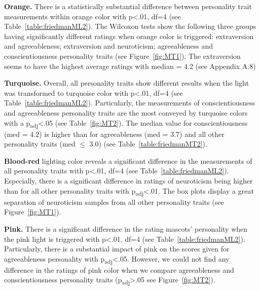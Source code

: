 \par\textbf{Orange.}
There is a statistically substantial difference between personality trait measurements within
orange color with p<.01, df=4 (see Table~\ref{table:friedmanML2}).
The Wilcoxon tests show the following three groups having significantly different ratings when orange
color is triggered: extraversion and agreeableness;
extraversion and neuroticism;
agreeableness and conscientiousness personality traits (see Figure~\ref{fig:MT1}).
The extraversion seems to have the highest average ratings with median = 4.2 (see Appendix A.8)

\par\textbf{Turquoise.}
Overall, all personality traits show different results when the light was transformed to turquoise color
with p<.01, df=4 (see Table~\ref{table:friedmanML2}).
Particularly, the measurements of conscientiousness and agreeableness personality traits are the most
conveyed by turquoise colors with a p\textsubscript{adj}<.05 (see Table~\ref{fig:MT2}).
The median value for conscientiousness (med = 4.2) is higher than for agreeableness
(med = 3.7) and all other personality traits (med $\leq$ 3.0) (see Table~\ref{table:friedmanMT2}).

\par\textbf{Blood-red}
lighting color reveals a significant difference in the measurements of all personality traits
with p<.01, df=4 (see Table~\ref{table:friedmanML2}).
Especially, there is a significant difference in ratings of neuroticism
being higher than for all other personality traits with p\textsubscript{adj}<.01.
The box plots display a great separation of neuroticism samples from all
other personality traits (see Figure~\ref{fig:MT1}).


\par\textbf{Pink.}
There is a significant difference in the rating mascots' personality when the pink light is
triggered with p<.01, df=4 (see Table~\ref{table:friedmanML2}).
Particularly, there is a substantial impact of pink on the scores given
for agreeableness personality with p\textsubscript{adj}<.05.
However, we could not find any difference in the ratings of pink color when
we compare agreeableness and conscientiousness personality traits
(p\textsubscript{adj}>.05 see Figure~\ref{fig:MT2}).


